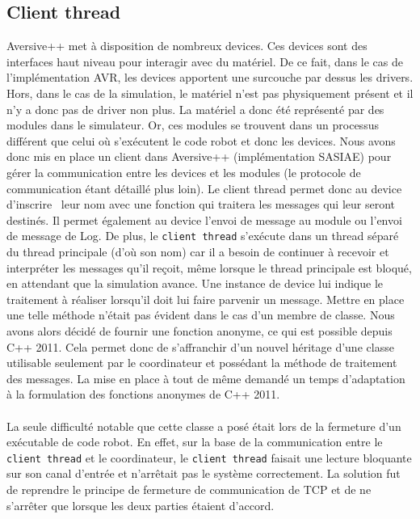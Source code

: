 \subsection{Client thread}

Aversive++ met à disposition de nombreux devices. Ces devices sont des interfaces haut niveau pour interagir avec du matériel. De ce fait, dans le cas de l'implémentation AVR, les devices apportent une surcouche par dessus les drivers. Hors, dans le cas de la simulation, le matériel n'est pas physiquement présent et il n'y a donc pas de driver non plus. La matériel a donc été représenté par des modules dans le simulateur. Or, ces modules se trouvent dans un processus différent que celui où s'exécutent le code robot et donc les devices. Nous avons donc mis en place un client dans Aversive++ (implémentation SASIAE) pour gérer la communication entre les devices et les modules (le protocole de communication étant détaillé plus loin).  Le client thread permet donc au device \og d'inscrire \fg\ leur nom avec une fonction qui traitera les messages qui leur seront destinés. Il permet également au device l'envoi de message au module ou l'envoi de message de Log. De plus, le \texttt{client thread} s'exécute dans un thread séparé du thread principale (d'où son nom) car il a besoin de continuer à recevoir et interpréter les messages qu'il reçoit, même lorsque le thread principale est bloqué, en attendant que la simulation avance. Une instance de device lui indique le traitement à réaliser lorsqu'il doit lui faire parvenir un message. Mettre en place une telle méthode n'était pas évident dans le cas d'un membre de classe. Nous avons alors décidé de fournir une fonction anonyme, ce qui est possible depuis C++ 2011. Cela permet donc de s'affranchir d'un nouvel héritage d'une classe utilisable seulement par le coordinateur et possédant la méthode de traitement des messages. La mise en place à tout de même demandé un temps d'adaptation à la formulation des fonctions anonymes de C++ 2011.

\paragraph{}
La seule difficulté notable que cette classe a posé était lors de la fermeture d'un exécutable de code robot. En effet, sur la base de la communication entre le \texttt{client thread} et le coordinateur, le \texttt{client thread} faisait une lecture bloquante sur son canal d'entrée et n'arrêtait pas le système correctement. La solution fut de reprendre le principe de fermeture de communication de TCP et de ne s'arrêter que lorsque les deux parties étaient d'accord.

